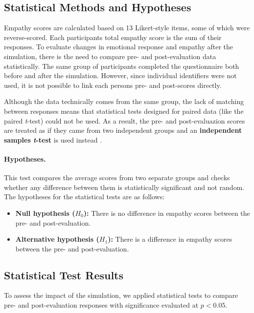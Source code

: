 \subsection{Statistical Methods and Hypotheses}

Empathy scores are calculated based on 13 Likert-style items, some of which were reverse-scored. Each participants total empathy score is the sum of their responses. To evaluate changes in emotional response and empathy after the simulation, there is the need to compare pre- and post-evaluation data statistically. The same group of participants completed the questionnaire both before and after the simulation. However, since individual identifiers were not used, it is not possible to link each persons pre- and post-scores directly.

Although the data technically comes from the same group, the lack of matching between responses means that statistical tests designed for paired data (like the paired \textit{t}-test) could not be used. As a result, the pre- and post-evaluazion scores are treated as if they came from two independent groups and an \textbf{independent samples \textit{t}-test} is used instead \cite{independentTtest}.

\paragraph{Hypotheses.} This test compares the average scores from two separate groups and checks whether any difference between them is statistically significant and not random. The hypotheses for the statistical tests are as follows:

\begin{itemize}
  \item \textbf{Null hypothesis ($H_0$):} There is no difference in empathy scores between the pre- and post-evaluation.
  \item \textbf{Alternative hypothesis ($H_1$):} There is a difference in empathy scores between the pre- and post-evaluation.
\end{itemize}


\subsection{Statistical Test Results}

To assess the impact of the simulation, we applied statistical tests to compare pre- and post-evaluation responses with significance evaluated at $p < 0.05$.

